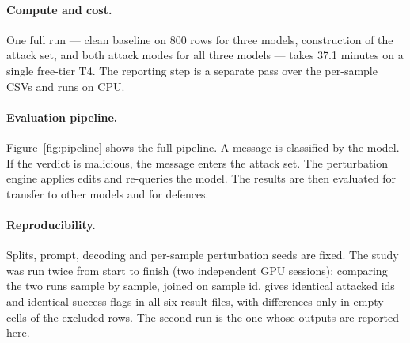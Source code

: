 \paragraph{Compute and cost.}
One full run --- clean baseline on 800 rows for three models, construction of the
attack set, and both attack modes for all three models --- takes 37.1 minutes on
a single free-tier T4. The reporting step is a separate pass over the per-sample
CSVs and runs on CPU.

\paragraph{Evaluation pipeline.}
Figure~\ref{fig:pipeline} shows the full pipeline. A message is classified by the
model. If the verdict is malicious, the message enters the attack set. The
perturbation engine applies edits and re-queries the model. The results are then
evaluated for transfer to other models and for defences.



\paragraph{Reproducibility.}
Splits, prompt, decoding and per-sample perturbation seeds are fixed. The study
was run twice from start to finish (two independent GPU sessions); comparing the
two runs sample by sample, joined on sample id, gives identical attacked ids and
identical success flags in all six result files, with differences only in empty
cells of the excluded rows. The second run is the one whose outputs are reported
here.
